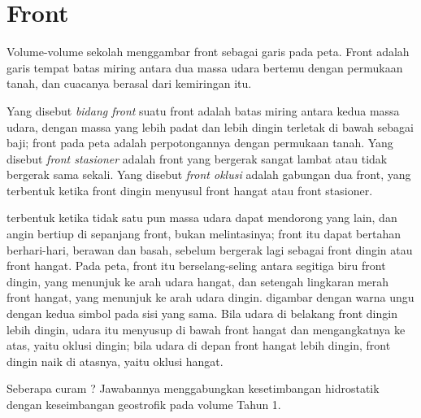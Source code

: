 \section{Front}\label{sec:b2:weather-systems:fronts}

Volume-volume sekolah menggambar front sebagai garis pada peta. Front adalah garis tempat batas miring
antara dua massa udara bertemu dengan permukaan tanah, dan cuacanya berasal dari kemiringan itu.

\begin{definition}\label{def:b2:weather-systems:fronts}
Yang disebut \emph{bidang front} suatu front adalah batas miring antara
kedua massa udara, dengan massa yang lebih padat dan lebih dingin terletak di bawah sebagai baji; front pada peta adalah
perpotongannya dengan permukaan tanah. Yang disebut \emph{front stasioner} adalah front
yang bergerak sangat lambat atau tidak bergerak sama sekali. Yang disebut \emph{front oklusi} adalah
gabungan dua front, yang terbentuk ketika front dingin menyusul front hangat atau front stasioner.
\end{definition}

 terbentuk ketika tidak satu pun massa udara dapat mendorong yang lain, dan angin bertiup di sepanjang
front, bukan melintasinya; front itu dapat bertahan berhari-hari, berawan dan basah, sebelum bergerak lagi sebagai front dingin
atau front hangat. Pada peta, front itu berselang-seling antara segitiga biru front dingin, yang menunjuk ke arah
udara hangat, dan setengah lingkaran merah front hangat, yang menunjuk ke arah udara dingin.  digambar dengan warna ungu dengan kedua simbol pada sisi yang sama. Bila udara di belakang front dingin
lebih dingin, udara itu menyusup di bawah front hangat dan mengangkatnya ke atas, yaitu oklusi dingin; bila udara
di depan front hangat lebih dingin, front dingin naik di atasnya, yaitu oklusi hangat.

Seberapa curam ? Jawabannya menggabungkan kesetimbangan hidrostatik dengan keseimbangan
geostrofik pada volume Tahun 1.

